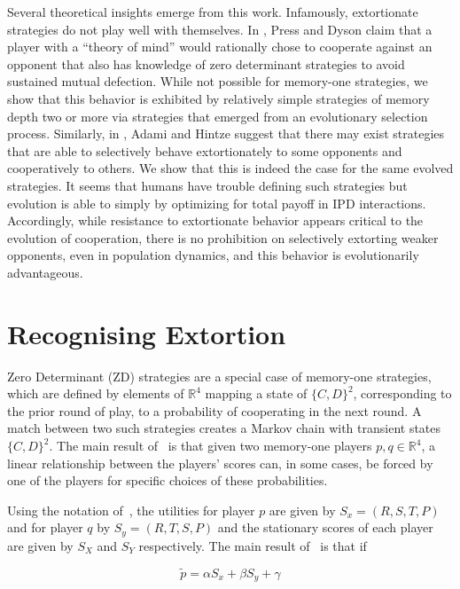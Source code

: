 \documentclass[a4paper]{article}
\begin{document}
Several theoretical insights emerge from this work. Infamously, extortionate
strategies do not play well with themselves. In \cite{press2012},
Press and Dyson claim that a player with a ``theory of mind'' would
rationally chose to cooperate against an opponent that also has knowledge
of zero determinant strategies to avoid sustained mutual defection. While not
possible for memory-one strategies, we show that this behavior is exhibited by
relatively simple strategies of memory depth two or more via strategies that
emerged from an evolutionary selection process. Similarly, in
\cite{adami2013evolutionary}, Adami and Hintze suggest that there may exist
strategies that are able to selectively behave extortionately to some opponents
and cooperatively to others. We show that this is indeed the case for the same
evolved strategies. It seems that humans have trouble defining such strategies
but evolution is able to simply by optimizing for total payoff in IPD
interactions. Accordingly, while resistance to extortionate behavior appears
critical to the evolution of cooperation, there is no prohibition on selectively
extorting weaker opponents, even in population dynamics, and this behavior is
evolutionarily advantageous.


\section{Recognising Extortion}\label{sec:sserror-zd-strategies}

Zero Determinant (ZD) strategies are a special case of memory-one strategies,
which are defined by elements of \(\mathbb{R}^4\) mapping a state of
\({\{C, D\}}^2\), corresponding to the prior round of play, to a probability of
cooperating in the next round. A match between two such strategies creates a
Markov chain with transient states \({\{C, D\}}^2\). The main result
of~\cite{Press2012} is that given two memory-one players \(p,
q\in\mathbb{R}^4\), a linear relationship between the players' scores can, in
some cases, be forced by one of the players for specific choices of these
probabilities.

Using the notation of~\cite{Press2012}, the utilities for player \(p\)
are given by \(S_x=(R, S, T, P)\) and for player \(q\) by \(S_y=(R, T, S, P)\)
and the stationary scores of each player are given by \(S_X\) and \(S_Y\)
respectively. The main result of~\cite{Press2012} is that if

\begin{equation}\label{eqn:linear_relationship_for_p}
    \tilde p=\alpha S_x + \beta S_y + \gamma
\end{equation}
\end{document}

